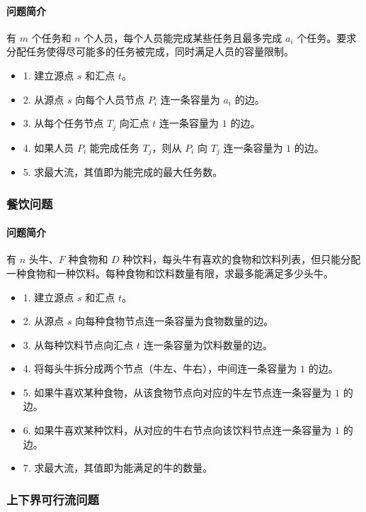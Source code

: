 \paragraph{问题简介}
有 $m$ 个任务和 $n$ 个人员，每个人员能完成某些任务且最多完成 $a_i$ 个任务。要求分配任务使得尽可能多的任务被完成，同时满足人员的容量限制。

\begin{itemize}
    \item 1. 建立源点 $s$ 和汇点 $t$。
    \item 2. 从源点 $s$ 向每个人员节点 $P_i$ 连一条容量为 $a_i$ 的边。
    \item 3. 从每个任务节点 $T_j$ 向汇点 $t$ 连一条容量为 $1$ 的边。
    \item 4. 如果人员 $P_i$ 能完成任务 $T_j$，则从 $P_i$ 向 $T_j$ 连一条容量为 $1$ 的边。
    \item 5. 求最大流，其值即为能完成的最大任务数。
\end{itemize}

\subsubsection{餐饮问题}
\paragraph{问题简介}
有 $n$ 头牛、$F$ 种食物和 $D$ 种饮料，每头牛有喜欢的食物和饮料列表，但只能分配一种食物和一种饮料。每种食物和饮料数量有限，求最多能满足多少头牛。

\begin{itemize}
    \item 1. 建立源点 $s$ 和汇点 $t$。
    \item 2. 从源点 $s$ 向每种食物节点连一条容量为食物数量的边。
    \item 3. 从每种饮料节点向汇点 $t$ 连一条容量为饮料数量的边。
    \item 4. 将每头牛拆分成两个节点（牛左、牛右），中间连一条容量为 $1$ 的边。
    \item 5. 如果牛喜欢某种食物，从该食物节点向对应的牛左节点连一条容量为 $1$ 的边。
    \item 6. 如果牛喜欢某种饮料，从对应的牛右节点向该饮料节点连一条容量为 $1$ 的边。
    \item 7. 求最大流，其值即为能满足的牛的数量。
\end{itemize}

\subsubsection{上下界可行流问题}
